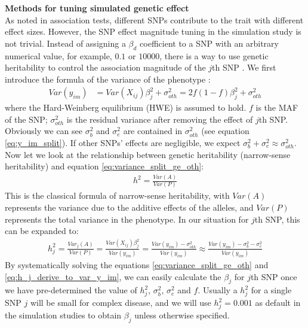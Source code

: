 \documentclass[12pt]{article}
\begin{document}
\textbf{Methods for tuning simulated genetic effect}\\
As noted in association tests, different SNPs contribute to the trait with different effect sizes. However, the SNP effect magnitude tuning in the simulation study is not trivial. Instead of assigning a $\beta_d$ coefficient to a SNP with an arbitrary numerical value, for example, $0.1$ or $10000$, there is a way to use genetic heritability to control the association magnitude of the $j$th SNP \cite{Lynch1998}. We first introduce the formula of the variance of the phenotype  :
\begin{align}
Var(y_{im} ) & = Var(X_{ij}) \beta_j^2 + \sigma_{oth} ^ 2  = 2f(1-f) \beta_j^2 + \sigma_{oth}^2
\label{eq:variance_split_ge_oth}
\end{align}
where the Hard-Weinberg equilibrium (HWE) is assumed to hold. $f$ is the MAF of the SNP; $\sigma_{oth}^2$ is the residual variance after removing the effect of $j$th SNP. Obviously we can see $\sigma_b^2$ and $\sigma_e^2$ are contained in $\sigma_{oth}^2$ (see equation \eqref{eq:y_im_split}). If other SNPs' effects are negligible, we expect $\sigma_b^2 + \sigma_e^2 \approx \sigma_{oth}^2$. Now let we look at the relationship between genetic heritability (narrow-sense heritability) and equation \eqref{eq:variance_split_ge_oth}:
\begin{align}
h^2 = \frac{Var(A)}{Var(P)}
\end{align}
This is the classical formula of narrow-sense heritability, with $Var(A)$ represents the variance due to the additive effects of the alleles, and $Var(P)$ represents the total variance in the phenotype. In our situation for $j$th SNP, this can be expanded to:
\begin{align}
h_j^2 = \frac{Var_j(A)}{Var(P)} = \frac{Var(X_{ij}) \beta_j^2 } {Var(y_{im} )} = \frac{Var(y_{im} ) - \sigma^2_{oth} } {Var(y_{im} )} \approx \frac{Var(y_{im} ) - \sigma_b^2 - \sigma_e^2 } {Var(y_{im} )}
\label{eq:h_j_derive_to_var_y_im}
\end{align}
By systematically solving the equations \eqref{eq:variance_split_ge_oth} and \eqref{eq:h_j_derive_to_var_y_im}, we can easily calculate the $\beta_j$ for $j$th SNP once we have pre-determined the value of $h_j^2$, $\sigma_b^2$, $\sigma_e^2$ and $f$. Usually a $h_j^2$ for a single SNP $j$ will be small for complex disease, and we will use $h_j^2 = 0.001$ as default in the simulation studies to obtain $\beta_j$ unless otherwise specified.
\end{document}
